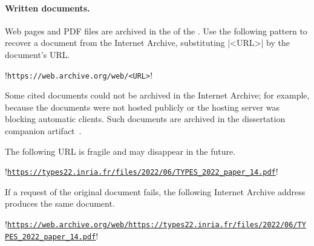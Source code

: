 \paragraph*{Written documents.}
Web pages and PDF files are archived in the  of the
. Use the following pattern to recover a document from the
Internet Archive, substituting \pr|<URL>| by the document's URL\@.

\begin{center}
\begin{minipage}{\textwidth}
\begin{browserlisting}
!\texttt{https://web.archive.org/web/<URL>}!
\end{browserlisting}
\end{minipage}
\end{center}

Some cited documents could not be archived in the Internet Archive; for example,
because the documents were not hosted publicly or the hosting server was
blocking automatic clients. Such documents are archived in the dissertation
companion artifact~\cite{aicc}.

\begin{example}

The following URL is fragile and may disappear in the future.

\begin{center}
\begin{minipage}{\textwidth}
\begin{browserlisting}
!\texttt{\url{https://types22.inria.fr/files/2022/06/TYPES_2022_paper_14.pdf}}!
\end{browserlisting}
\end{minipage}
\end{center}

If a request of the original document fails, the following Internet Archive
address produces the same document.

\begin{center}
\begin{minipage}{\textwidth}
\begin{browserlisting}
!\texttt{\url{https://web.archive.org/web/https://types22.inria.fr/files/2022/06/TYPES_2022_paper_14.pdf}}!
\end{browserlisting}
\end{minipage}
\end{center}
\end{example}